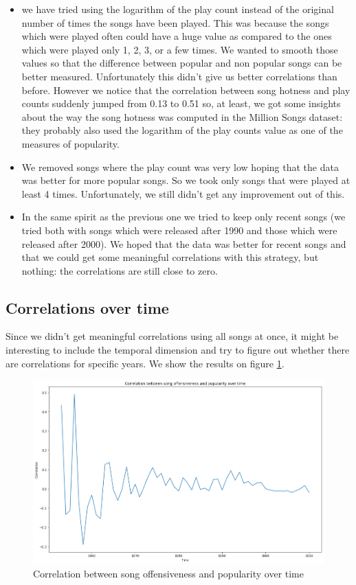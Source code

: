 \documentclass[11pt]{article}
\begin{document}
\begin{itemize}
\item we have tried using the logarithm of the play count instead of the original number of times the songs have been played. This was because the songs which were played often could have a huge value as compared to the ones which were played only 1, 2, 3, or a few times. We wanted to smooth those values so that the difference between popular and non popular songs can be better measured. Unfortunately this didn't give us better correlations than before. However we notice that the correlation between song hotness and play counts suddenly jumped from 0.13 to 0.51 so, at least, we got some insights about the way the song hotness was computed in the Million Songs dataset: they probably also used the logarithm of the play counts value as one of the measures of popularity.
\item We removed songs where the play count was very low hoping that the data was better for more popular songs. So we took only songs that were played at least 4 times. Unfortunately, we still didn't get any improvement out of this.
\item In the same spirit as the previous one we tried to keep only recent songs (we tried both with songs which were released after 1990 and those which were released after 2000). We hoped that the data was better for recent songs and that we could get some meaningful correlations with this strategy, but nothing: the correlations are still close to zero.
 \end{itemize}


\subsection{Correlations over time}
Since we didn't get meaningful correlations using all songs at once, it might be interesting to include the temporal dimension and try to figure out whether there are correlations for specific years. We show the results on figure \ref{correlation_time}.

\begin{figure}
\includegraphics[width=\linewidth]{plots/correlation_time}
\caption{Correlation between song offensiveness and popularity over time}
\label{correlation_time}
\end{figure}
\end{document}
